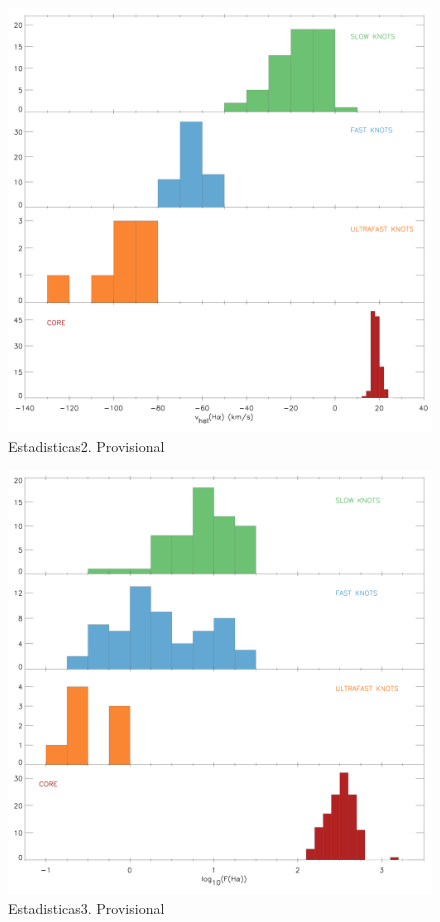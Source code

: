 \documentclass[a4paper,fleqn,usenatbib]{mnras}     %
\begin{document}
\begin{figure}
  \includegraphics[width=\columnwidth]{Figs/prov/Hist_vHa.pdf} 
    \caption{Estadisticas2. Provisional}
\end{figure}

\begin{figure}
    \includegraphics[width=\columnwidth]{Figs/prov/Hist_FHa.pdf} 
    \caption{Estadisticas3. Provisional}
\end{figure}
\end{document}
